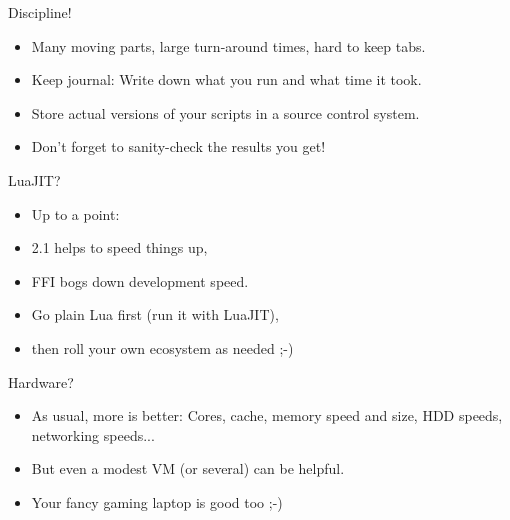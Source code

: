 \documentclass[handout]{beamer}
\begin{document}

\begin{frame}{Discipline!}

\begin{itemize}
\item Many moving parts, large turn-around times, hard to keep tabs.
\item Keep journal: Write down what you run and what time it took.
\item Store actual versions of your scripts in a source control system.
\item Don't forget to sanity-check the results you get!
\end{itemize}

\end{frame}


\begin{frame}{LuaJIT?}

\begin{itemize}
\item Up to a point:
\item 2.1 helps to speed things up,
\item FFI bogs down development speed.
\item Go plain Lua first (run it with LuaJIT),
\item then roll your own ecosystem as needed ;-)
\end{itemize}

\end{frame}


\begin{frame}{Hardware?}

\begin{itemize}
\item As usual, more is better: Cores, cache, memory speed and size,
      HDD speeds, networking speeds...
\item But even a modest VM (or several) can be helpful.
\item Your fancy gaming laptop is good too ;-)
\end{itemize}

\end{frame}

\end{document}
